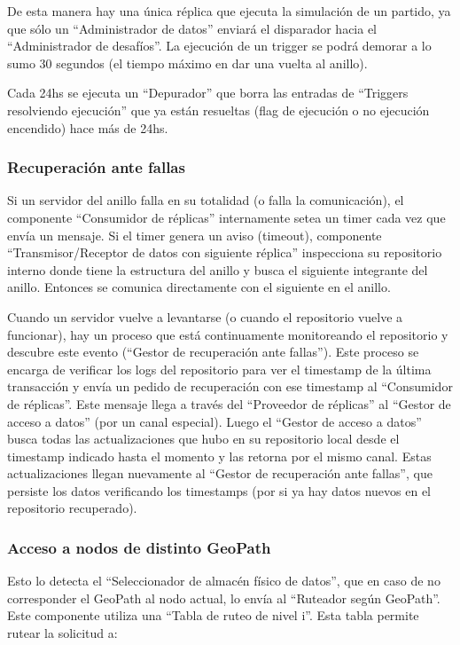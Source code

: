 De esta manera hay una única réplica que ejecuta la simulación de un partido, ya que sólo un “Administrador de datos” enviará el disparador hacia el “Administrador de desafíos”. La ejecución de un trigger se podrá demorar a lo sumo 30 segundos (el tiempo máximo en dar una vuelta al anillo).

Cada 24hs se ejecuta un “Depurador” que borra las entradas de “Triggers resolviendo ejecución” que ya están resueltas (flag de ejecución o no ejecución encendido) hace más de 24hs.


\subsubsection{Recuperación ante fallas}

Si un servidor del anillo falla en su totalidad (o falla la comunicación), el componente “Consumidor de réplicas” internamente setea un timer cada vez que envía un mensaje. Si el timer genera un aviso (timeout), componente “Transmisor/Receptor de datos con siguiente réplica” inspecciona su repositorio interno donde tiene la estructura del anillo y busca el siguiente integrante del anillo. Entonces se comunica directamente con el siguiente en el anillo.

Cuando un servidor vuelve a levantarse (o cuando el repositorio vuelve a funcionar), hay un proceso que está continuamente monitoreando el repositorio y descubre este evento (“Gestor de recuperación ante fallas”). Este proceso se encarga de verificar los logs del repositorio para ver el timestamp de la última transacción y envía un pedido de recuperación con ese timestamp al “Consumidor de réplicas”. Este mensaje llega a través del “Proveedor de réplicas” al “Gestor de acceso a datos” (por un canal especial). Luego el “Gestor de acceso a datos” busca todas las actualizaciones que hubo en su repositorio local desde el timestamp indicado hasta el momento y las retorna por el mismo canal. Estas actualizaciones llegan nuevamente al “Gestor de recuperación ante fallas”, que persiste los datos verificando los timestamps (por si ya hay datos nuevos en el repositorio recuperado). 


\subsubsection{Acceso a nodos de distinto GeoPath}

Esto lo detecta el “Seleccionador de almacén físico de datos”, que en caso de no corresponder el GeoPath al nodo actual, lo envía al “Ruteador según GeoPath”. Este componente utiliza una “Tabla de ruteo de nivel i”. Esta tabla permite rutear la solicitud a:

